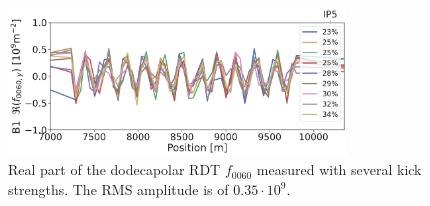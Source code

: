 \begin{figure}[!htb]
    \centering
    \includegraphics[width=0.8\textwidth]{./images/f0060y_all_meas_real.pdf}
    \caption{Real part of the dodecapolar RDT $f_{0060}$ measured with several kick strengths. The
    RMS amplitude is of $0.35\cdot10^{9}$.}
    \label{fig:high_orders:dodecapolar_f0060}
\end{figure}


